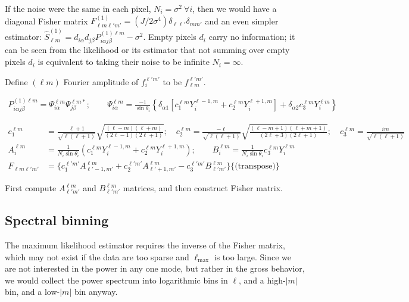 \documentclass[twocolumn]{aastex63}
\begin{document}
If the noise were the same in each pixel, $N_i = \sigma^2~ \forall i$, then we would have a diagonal Fisher matrix $F^{(1)}_{\ell m \ell' m'} = (J/2\sigma^4)\delta_{\ell \ell'} \delta_{m m'}$ and an even simpler estimator: $\hat{S}^{(1)}_{\ell m} = d_{i \alpha} d_{j \beta} P^{(1)\ell m}_{i \alpha j \beta} - \sigma^2$. Empty pixels $d_i$ carry no information; it can be seen from the likelihood or its estimator that not summing over empty pixels $d_i$ is equivalent to taking their noise to be infinite $N_i = \infty$.

Define $(\ell m)$ Fourier amplitude of $f^{\ell' m'}_i$ to be $f_{\ell m}^{\ell' m'}$. 
\begin{widetext}
\begin{align}
P^{(1) \ell m}_{i\alpha j \beta} = \Psi^{\ell m}_{i\alpha} \Psi^{\ell m *}_{j \beta}; \qquad 
\Psi^{\ell m}_{i \alpha} = \frac{-1}{\sin \theta_i} \left\lbrace \delta_{\alpha 1} \left[ c^{\ell m}_1 Y^{\ell-1, m}_i + c^{\ell m}_2 Y^{\ell+1, m}_i \right] + \delta_{\alpha 2} c^{\ell m}_3 Y^{\ell m}_i \right\rbrace 
\end{align}
\end{widetext}

\begin{widetext}
\begin{align}
c^{\ell m}_1 &= \frac{\ell + 1}{\sqrt{\ell(\ell+1)}} \sqrt{\frac{(\ell - m)(\ell + m)}{(2\ell -1)(2\ell +1)}}; \quad
c^{\ell m}_2 = \frac{-\ell}{\sqrt{\ell(\ell+1)}} \sqrt{\frac{(\ell - m+1)(\ell + m+1)}{(2\ell +3)(2\ell +1)}}; \quad
c^{\ell m}_3 = \frac{i m}{\sqrt{\ell(\ell+1)}} \\
A^{\ell m}_i &= \frac{1}{N_i \sin \theta_i} \left( c^{\ell m}_1 Y^{\ell-1,m}_i + c^{\ell m}_2 Y^{\ell+1,m}_i \right); \qquad 
B^{\ell m}_i = \frac{1}{N_i \sin \theta_i} c^{\ell m}_3 Y^{\ell m}_i\\ 
F_{\ell m \ell' m'} &=  \big\lbrace c^{\ell' m'}_1 A^{\ell m}_{\ell'-1,m'} + c^{\ell' m'}_2 A^{\ell m}_{\ell'+1,m'} - c^{\ell' m'}_3 B^{\ell m}_{\ell' m'} \big\rbrace \big\lbrace \text{(transpose)} \big\rbrace
\end{align}
\end{widetext}

First compute $A^{\ell m}_{\ell' m'}$ and $B^{\ell m}_{\ell' m'}$ matrices, and then construct Fisher matrix.

\subsection{Spectral binning}
The maximum likelihood estimator requires the inverse of the Fisher matrix, which may not exist if the data are too sparse and $\ell_\text{max}$ is too large. Since we are not interested in the power in any one mode, but rather in the gross behavior, we would collect the power spectrum into logarithmic bins in $\ell$, and a high-$|m|$ bin, and a low-$|m|$ bin anyway.
\end{document}
